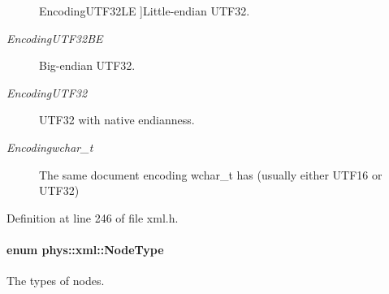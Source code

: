 \begin{Desc}
\begin{description}
{{EncodingUTF32LE}
\label{namespacephys_1_1xml_a420f5de782438f88160321385bea2015a127752883aaf8c9bdb5f66ec725211fc}
}]Little-\/endian UTF32. \item[{\em 
\hypertarget{namespacephys_1_1xml_a420f5de782438f88160321385bea2015a5fb13deaf1552b0f4c00e2b8cafce0b9}{
EncodingUTF32BE}
\label{namespacephys_1_1xml_a420f5de782438f88160321385bea2015a5fb13deaf1552b0f4c00e2b8cafce0b9}
}]Big-\/endian UTF32. \item[{\em 
\hypertarget{namespacephys_1_1xml_a420f5de782438f88160321385bea2015ac61c2f632bd66c2466c29783beb33f8a}{
EncodingUTF32}
\label{namespacephys_1_1xml_a420f5de782438f88160321385bea2015ac61c2f632bd66c2466c29783beb33f8a}
}]UTF32 with native endianness. \item[{\em 
\hypertarget{namespacephys_1_1xml_a420f5de782438f88160321385bea2015a2bc9c8d42796901c8feaa25e17c56cef}{
Encodingwchar\_\-t}
\label{namespacephys_1_1xml_a420f5de782438f88160321385bea2015a2bc9c8d42796901c8feaa25e17c56cef}
}]The same document encoding wchar\_\-t has (usually either UTF16 or UTF32) \end{description}
\end{Desc}



Definition at line 246 of file xml.h.

\hypertarget{namespacephys_1_1xml_a668b0cc666a9d49f7c7222a7552115d3}{
\paragraph[{NodeType}]{\setlength{\rightskip}{0pt plus 5cm}enum {\bf phys::xml::NodeType}}\hfill}
\label{namespacephys_1_1xml_a668b0cc666a9d49f7c7222a7552115d3}


The types of nodes. 

